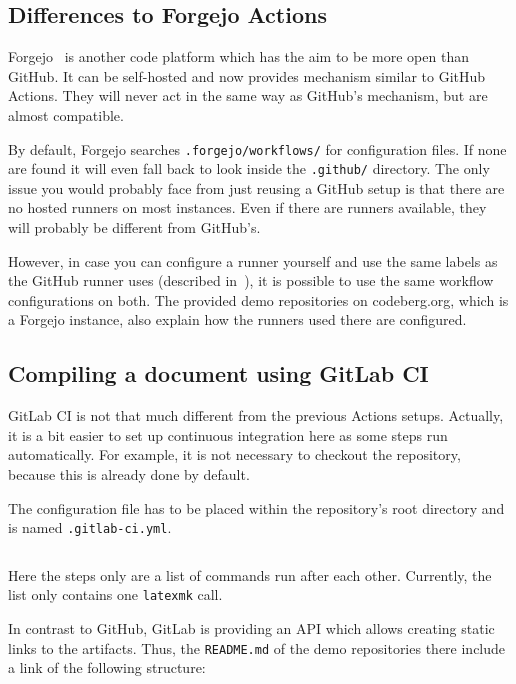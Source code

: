 \documentclass[final]{ltugboat}
\newcommand*{\setListingIcon}[1]{\def\listingIcon{#1}}
\newcommand*{\command}[1]{\texttt{#1}}
\newcommand*{\file}[1]{\texttt{#1}}
\newcommand*{\directory}[1]{\texttt{#1}}
\begin{document}
\subsection{Differences to Forgejo Actions}
Forgejo~\cite{forgejo} is another code platform which has the aim to be more open than GitHub.
It can be self-hosted and now provides mechanism similar to GitHub Actions.
They will never act in the same way as GitHub's mechanism, but are almost compatible.

By default, Forgejo searches \directory{.forgejo/workflows/} for configuration files.
If none are found it will even fall back to look inside the \directory{.github/} directory.
The only issue you would probably face from just reusing a GitHub setup is that there are no hosted runners on most instances.
Even if there are runners available, they will probably be different from GitHub's.

However, in case you can configure a runner yourself and use the same labels as the GitHub runner uses (described in~\cite{forgejo-runner-config}), it is possible to use the same workflow configurations on both.
The provided demo repositories on codeberg.org, which is a Forgejo instance, also explain how the runners used there are configured.

\subsection{Compiling a document using GitLab CI}
\setListingIcon{\GitLab}

GitLab CI is not that much different from the previous Actions setups.
Actually, it is a bit easier to set up continuous integration here as some steps run automatically.
For example, it is not necessary to checkout the repository, because this is already done by default.

The configuration file has to be placed within the repository's root directory and is named \file{.gitlab-ci.yml}.

\inputminted[breaklines,breakafter=/]{yaml}{examples/latex-basic-gitlab.yml}

Here the steps only are a list of commands run after each other. Currently, the list only contains one \command{latexmk} call.

In contrast to GitHub, GitLab is providing an API which allows creating static links to the artifacts.
Thus, the \file{README.md} of the demo repositories there include a link of the following structure:
\end{document}
